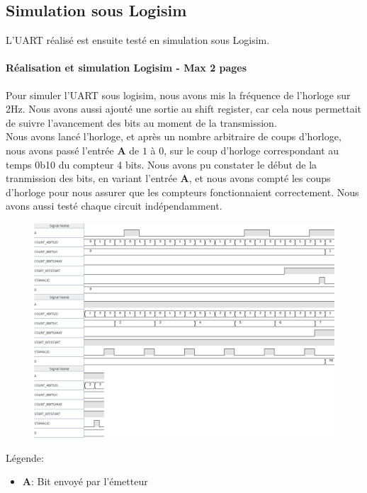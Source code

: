 \documentclass[a4paper]{article} %
\begin{document}
 \subsection{Simulation sous Logisim}
L’UART réalisé est ensuite testé en simulation sous Logisim.
\begin{tcolorbox}[colframe=Monokaimagenta,colback=white]
\paragraph{Réalisation et simulation Logisim - Max 2 pages}
Pour simuler l'UART sous logisim, nous avons mis la fréquence de l'horloge sur 2Hz. Nous avons aussi ajouté une sortie au shift register, car cela nous permettait de suivre l'avancement des bits au moment de la transmission.\\
Nous avons lancé l'horloge, et après un nombre arbitraire de coups d'horloge, nous avons passé l'entrée \textbf{A} de $1$ à $0$, sur le coup d'horloge correspondant au temps 0b10 du compteur 4 bits. Nous avons pu constater le début de la tranmission des bits, en variant l'entrée \textbf{A}, et nous avons compté les coups d'horloge pour nous assurer que les compteurs fonctionnaient correctement.
Nous avons aussi testé chaque circuit indépendamment.
\\
\begin{figure}[H]
\centering
    \includegraphics[width=1\textwidth]{src/CHRONO_UART_OK.png}
    \label{fig:chronoUART}
\end{figure}
Légende:
\begin{itemize}
    \item     \textbf{A}: Bit envoyé par l'émetteur

\end{itemize}
\end{tcolorbox}
\end{document}
